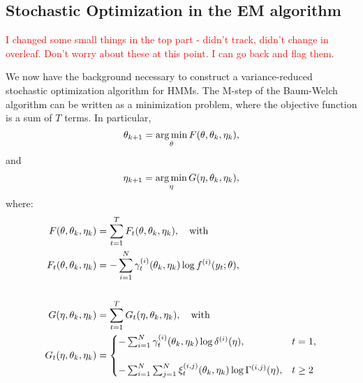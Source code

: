 \subsection{Stochastic Optimization in the EM algorithm}

\textcolor{red}{I changed some small things in the top part - didn't track, didn't change in overleaf.  Don't worry about these at this point.  I can go back and flag them.}

We now have the background necessary to construct a variance-reduced stochastic optimization algorithm for HMMs. The M-step of the Baum-Welch algorithm can be written as a minimization problem, where the objective function is a sum of $T$ terms. In particular, 
\begin{equation} 
    \theta_{k+1} = \operatorname*{arg\,min}_{\theta} F(\theta,\theta_k,\eta_k),
    \label{eqn:min_F}
\end{equation}
and
\begin{equation}
    \eta_{k+1} = \operatorname*{arg\,min}_{\eta} G(\eta,\theta_k,\eta_k),
    \label{eqn:min_G}
\end{equation}
where:
\begin{align}
    F(\theta, \theta_k,\eta_k) &= \sum_{t=1}^T F_t(\theta, \theta_k, \eta_k), \quad {\rm{with}} \\
    F_t(\theta, \theta_k, \eta_k) &= - \sum_{i=1}^N \gamma^{(i)}_t(\theta_k, \eta_k) \log f^{(i)}(y_t;\theta) \label{eqn:F}, \\ \nonumber \\
    G(\eta, \theta_k,\eta_k) &= \sum_{t=1}^{T} G_t(\eta, \theta_k, \eta_k), 
    \quad {\rm{with}} \\
    G_t(\eta, \theta_k, \eta_k) &= 
    \begin{cases}
        - \sum_{i=1}^N \gamma^{(i)}_t(\theta_k,\eta_k) \log \delta^{(i)}(\eta), & t = 1, \\\\
        - \sum_{i=1}^N \sum_{j=1}^N \xi^{(i,j)}_t(\theta_k, \eta_k) \log \Gamma^{(i,j)}(\eta), & t \geq 2
    \end{cases}
    \label{eqn:G}
\end{align}


